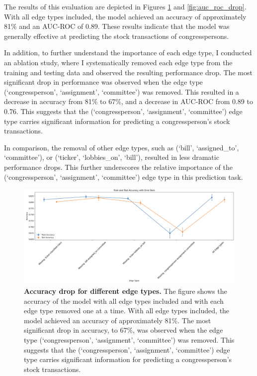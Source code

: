 \documentclass[15pt,letterpaper]{article}
\begin{document}
The results of this evaluation are depicted in Figures \ref{fig:accuracy_drop} and \ref{fig:auc_roc_drop}. With all edge types included, the model achieved an accuracy of approximately 81\% and an AUC-ROC of 0.89. These results indicate that the model was generally effective at predicting the stock transactions of congresspersons.

In addition, to further understand the importance of each edge type, I conducted an ablation study, where I systematically removed each edge type from the training and testing data and observed the resulting performance drop. The most significant drop in performance was observed when the edge type (`congressperson', `assignment', `committee') was removed. This resulted in a decrease in accuracy from 81\% to 67\%, and a decrease in AUC-ROC from 0.89 to 0.76. This suggests that the (`congressperson', `assignment', `committee') edge type carries significant information for predicting a congressperson's stock transactions.

In comparison, the removal of other edge types, such as (`bill', `assigned\_to', `committee'), or (`ticker', `lobbies\_on', `bill'), resulted in less dramatic performance drops. This further underscores the relative importance of the (`congressperson', `assignment', `committee') edge type in this prediction task.


\begin{figure}[h!]
  \centering
  \includegraphics[width=1.1\textwidth, height=0.4\textheight]{imgs/acc2.png}
  \caption{\textbf{Accuracy drop for different edge types.} The figure shows the accuracy of the model with all edge types included and with each edge type removed one at a time. With all edge types included, the model achieved an accuracy of approximately 81\%. The most significant drop in accuracy, to 67\%, was observed when the edge type (`congressperson', `assignment', `committee') was removed. This suggests that the (`congressperson', `assignment', `committee') edge type carries significant information for predicting a congressperson's stock transactions.}
  \label{fig:accuracy_drop}
\end{figure}  
\end{document}
